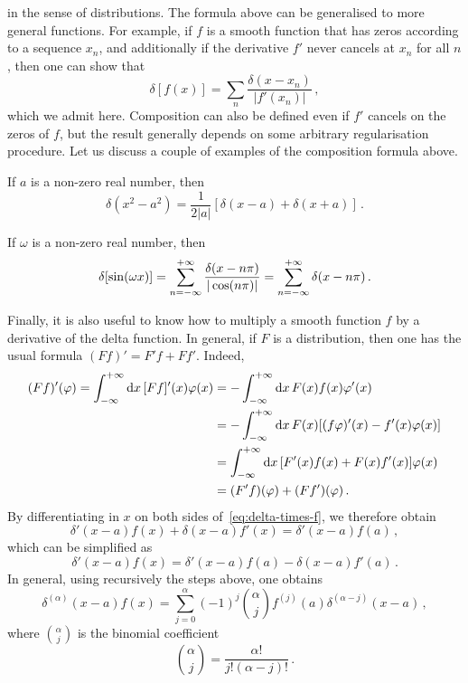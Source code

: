 in the sense of distributions. The formula above can be generalised to more general
functions. For example, if $f$ is a smooth function that has zeros according to a sequence
$x_n$, and additionally if the derivative $f'$ never cancels at $x_n$ for all $n$, then
one can show that
\begin{equation}
  \delta[f(x)]=\sum_n\frac{\delta(x-x_n)}{|f'(x_n)|}\,,
\end{equation}
which we admit here. Composition can also be defined even if $f'$ cancels on the zeros of
$f$, but the result generally depends on some arbitrary regularisation procedure. Let us
discuss a couple of examples of the composition formula above.
\begin{example}
  If $a$ is a non-zero real number, then
  \begin{equation}
    \delta(x^2-a^2)=\frac{1}{2|a|}[\delta(x-a)+\delta(x+a)]\,.
  \end{equation}
\end{example}
\begin{example}
  If $\omega$ is a non-zero real number, then
  \begin{equation}
    \delta[\sin(\omega x)]=\sum_{n=-\infty}^{+\infty}\frac{\delta(x-n\pi)}{|\cos(n\pi)|}=\sum_{n=-\infty}^{+\infty}\delta(x-n\pi)\,.
  \end{equation}
\end{example}

Finally, it is also useful to know how to multiply a smooth function $f$ by a derivative of
the delta function. In general, if $F$ is a distribution, then one has
the usual formula $(Ff)'=F'f+Ff'$. Indeed,
\begin{align}
  (Ff)'(\varphi)=\int_{-\infty}^{+\infty}\mathrm{d}{x}\,[Ff]'(x)\varphi(x)&=-\int_{-\infty}^{+\infty}\mathrm{d}{x}\,F(x)f(x)\varphi'(x)\notag\\
  &=-\int_{-\infty}^{+\infty}\mathrm{d}{x}\,F(x)[(f\varphi)'(x)-f'(x)\varphi(x)]\notag\\
  &=\int_{-\infty}^{+\infty}\mathrm{d}{x}\,[F'(x)f(x)+F(x)f'(x)]\varphi(x)\notag\\
  &=(F'f)(\varphi)+(Ff')(\varphi)\,.
\end{align}
By differentiating in $x$ on both sides of~\cref{eq:delta-times-f}, we therefore obtain
\begin{equation}
  \delta'(x-a)f(x)+\delta(x-a)f'(x)=\delta'(x-a)f(a)\,,
\end{equation}
which can be simplified as
\begin{equation}
  \label{eq:delta1-times-f}
  \delta'(x-a)f(x)=\delta'(x-a)f(a)-\delta(x-a)f'(a)\,.
\end{equation}
In general, using recursively the steps above, one obtains
\begin{equation}
  \label{eq:deltan-times-f}
  \delta^{(\alpha)}(x-a)f(x)
  =\sum_{j=0}^{\alpha}(-1)^j\binom{\alpha}{j}f^{(j)}(a)\delta^{(\alpha-j)}(x-a)\,,
\end{equation}
where $\binom{\alpha}{j}$ is the binomial coefficient
\begin{equation}
  \binom{\alpha}{j}=\frac{\alpha!}{j!(\alpha-j)!}\,.
\end{equation}
